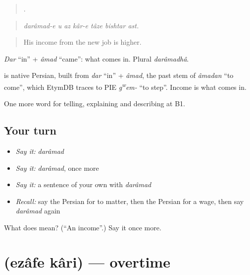 \begin{quote}
      .
\end{quote}

\begin{quote}
\emph{darâmad-e u az kâr-e tâze bishtar ast.}
\end{quote}

\begin{quote}
His income from the new job is higher.
\end{quote}

\emph{Dar} \textquotedblleft{}in\textquotedblright{} + \emph{âmad} \textquotedblleft{}came\textquotedblright{}: what comes in. Plural \emph{darâmadhâ}.

\begin{cousinweb}
\textbf{} is native Persian, built from \emph{dar} \textquotedblleft{}in\textquotedblright{} + \emph{âmad}, the past stem of \emph{âmadan} \textquotedblleft{}to come\textquotedblright{}, which EtymDB traces to PIE \emph{g\textsuperscript{w}em-} \textquotedblleft{}to step\textquotedblright{}. Income is what comes in.
\end{cousinweb}

\begin{grammarlens}[title={What you've built}]
One more word for telling, explaining and describing at B1.
\end{grammarlens}

\subsection*{Your turn}
\begin{itemize}
\raggedright
  \item \emph{Say it:} \emph{darâmad}
  \item \emph{Say it:} \emph{darâmad}, once more
  \item \emph{Say it:} a sentence of your own with \emph{darâmad}
  \item \emph{Recall:} say the Persian for to matter, then the Persian for a wage, then say \emph{darâmad} again
\end{itemize}

\begin{tcolorbox}[breakable,colback=teal!4,colframe=teal!35!black,title={Before you move on}]
What does  mean? (\textquotedblleft{}An income\textquotedblright{}.) Say it once more.
\end{tcolorbox}
\section[\texorpdfstring{\fa{اضافه} \fa{کاری} (ezâfe kâri)}{اضافه کاری (ezâfe kâri)}]{  (ezâfe kâri) — overtime}

